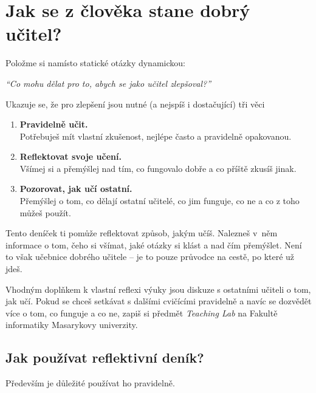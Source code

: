 
\chapter*{Jak se z člověka stane dobrý učitel?}

\vspace*{1em}
Položme si namísto statické otázky dynamickou:

\vspace*{1em}
\textit{\large \enquote{Co mohu dělat pro to, abych se jako učitel zlepšoval?}}

\vspace*{1em}
Ukazuje se, že pro zlepšení jsou nutné (a nejspíš i dostačující) tři věci\footnotemark
{}
\begin{enumerate}
\item \textbf{Pravidelně učit.}\\Potřebuješ mít vlastní zkušenost, nejlépe často a pravidelně opakovanou.
\item \textbf{Reflektovat svoje učení.}\\Všímej si a přemýšlej nad tím, co fungovalo dobře a co příště zkusíš jinak.
\item \textbf{Pozorovat, jak učí ostatní.}\\Přemýšlej o tom, co dělají ostatní učitelé, co jim funguje, co ne a co z toho můžeš použít.
\end{enumerate}

Tento deníček ti pomůže reflektovat způsob, jakým učíš. Nalezneš v~něm informace o tom, čeho si všímat, jaké otázky si klást a nad čím přemýšlet. Není to však učebnice dobrého učitele -- je to pouze průvodce na cestě, po které už jdeš.

Vhodným doplňkem k vlastní reflexi výuky jsou diskuze s ostatními učiteli o tom, jak učí. Pokud se chceš setkávat s dalšími cvičícími pravidelně a navíc se dozvědět více o tom, co funguje a co ne, zapiš si předmět \textit{Teaching Lab} na Fakultě informatiky Masarykovy univerzity.

\newpage
\section*{Jak používat reflektivní deník?}

Především je důležité používat ho pravidelně.

